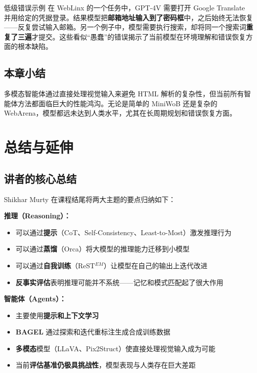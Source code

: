 \documentclass[a4paper]{article}
\begin{document}
\begin{warningbox}{低级错误示例}
在 WebLinx 的一个任务中，GPT-4V 需要打开 Google Translate 并用给定的凭据登录。结果模型把\textbf{邮箱地址输入到了密码框}中，之后始终无法恢复——反复尝试输入邮箱。另一个例子中，模型需要执行搜索，却将同一个搜索词\textbf{重复了三遍}才提交。这些看似``愚蠢''的错误揭示了当前模型在环境理解和错误恢复方面的根本缺陷。
\end{warningbox}

\subsection{本章小结}

多模态智能体通过直接处理视觉输入来避免 HTML 解析的复杂性，但当前所有智能体方法都面临巨大的性能鸿沟。无论是简单的 MiniWoB 还是复杂的 WebArena，模型都远未达到人类水平，尤其在长周期规划和错误恢复方面。


\section{总结与延伸}

\subsection{讲者的核心总结}





Shikhar Murty 在课程结尾将两大主题的要点归纳如下：

\textbf{推理（Reasoning）：}
\begin{itemize}
    \item 可以通过\textbf{提示}（CoT、Self-Consistency、Least-to-Most）激发推理行为
    \item 可以通过\textbf{蒸馏}（Orca）将大模型的推理能力迁移到小模型
    \item 可以通过\textbf{自我训练}（ReST$^{EM}$）让模型在自己的输出上迭代改进
    \item \textbf{反事实评估}表明推理可能并不系统——记忆和模式匹配起了很大作用
\end{itemize}

\textbf{智能体（Agents）：}
\begin{itemize}
    \item 主要使用\textbf{提示和上下文学习}
    \item \textbf{BAGEL} 通过探索和迭代重标注生成合成训练数据
    \item \textbf{多模态}模型（LLaVA、Pix2Struct）使直接处理视觉输入成为可能
    \item 当前\textbf{评估基准仍极具挑战性}，模型表现与人类存在巨大差距
\end{itemize}
\end{document}
